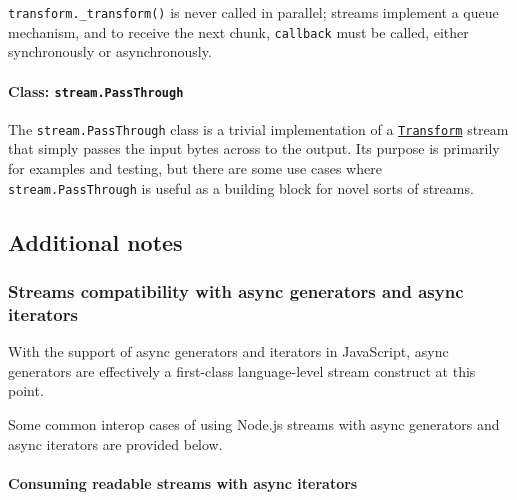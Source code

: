 \texttt{transform.\_transform()} is never called in parallel; streams
implement a queue mechanism, and to receive the next chunk,
\texttt{callback} must be called, either synchronously or
asynchronously.

\paragraph{\texorpdfstring{Class:
\texttt{stream.PassThrough}}{Class: stream.PassThrough}}\label{class-stream.passthrough}

The \texttt{stream.PassThrough} class is a trivial implementation of a
\hyperref[class-streamtransform]{\texttt{Transform}} stream that simply
passes the input bytes across to the output. Its purpose is primarily
for examples and testing, but there are some use cases where
\texttt{stream.PassThrough} is useful as a building block for novel
sorts of streams.

\subsection{Additional notes}\label{additional-notes}

\subsubsection{Streams compatibility with async generators and async
iterators}\label{streams-compatibility-with-async-generators-and-async-iterators}

With the support of async generators and iterators in JavaScript, async
generators are effectively a first-class language-level stream construct
at this point.

Some common interop cases of using Node.js streams with async generators
and async iterators are provided below.

\paragraph{Consuming readable streams with async
iterators}\label{consuming-readable-streams-with-async-iterators}

\begin{Shaded}
\begin{Highlighting}[]
\NormalTok{(} \NormalTok{() \{}
   \NormalTok{ (}
    \OperatorTok{;}
\NormalTok{  \}}
\NormalTok{\})()}\OperatorTok{;}
\end{Highlighting}
\end{Shaded}

